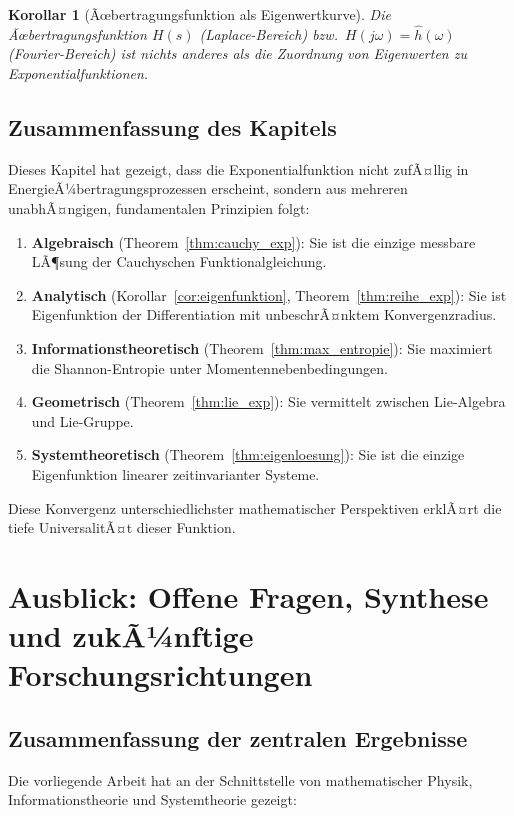 ﻿\documentclass[12pt,a4paper]{article}
\newtheorem{corollary}[theorem]{Korollar}
\theoremstyle{definition}
\theoremstyle{remark}
\begin{document}
\begin{corollary}[Ãœbertragungsfunktion als Eigenwertkurve]
Die Ãœbertragungsfunktion $H(s)$ (Laplace-Bereich) bzw.\ $H(j\omega) = \hat{h}(\omega)$ (Fourier-Bereich) ist nichts anderes als die Zuordnung von Eigenwerten zu Exponentialfunktionen.
\end{corollary}

\subsection{Zusammenfassung des Kapitels}

Dieses Kapitel hat gezeigt, dass die Exponentialfunktion nicht zufÃ¤llig in EnergieÃ¼bertra\-gungsprozessen erscheint, sondern aus mehreren unabhÃ¤ngigen, fundamentalen Prinzipien folgt:
\begin{enumerate}
\item \textbf{Algebraisch} (Theorem~\ref{thm:cauchy_exp}): Sie ist die einzige messbare LÃ¶sung der Cauchyschen Funktionalgleichung.
\item \textbf{Analytisch} (Korollar~\ref{cor:eigenfunktion}, Theorem~\ref{thm:reihe_exp}): Sie ist Eigenfunktion der Differentiation mit unbeschrÃ¤nktem Konvergenzradius.
\item \textbf{Informationstheoretisch} (Theorem~\ref{thm:max_entropie}): Sie maximiert die Shannon-Entropie unter Momentennebenbedingungen.
\item \textbf{Geometrisch} (Theorem~\ref{thm:lie_exp}): Sie vermittelt zwischen Lie-Algebra und Lie-Gruppe.
\item \textbf{Systemtheoretisch} (Theorem~\ref{thm:eigenloesung}): Sie ist die einzige Eigenfunktion linearer zeitinvarianter Systeme.
\end{enumerate}
Diese Konvergenz unterschiedlichster mathematischer Perspektiven erklÃ¤rt die tiefe UniversalitÃ¤t dieser Funktion.

\section{Ausblick: Offene Fragen, Synthese und zukÃ¼nftige Forschungsrichtungen}
\label{sec:ausblick}

\subsection{Zusammenfassung der zentralen Ergebnisse}

Die vorliegende Arbeit hat an der Schnittstelle von mathematischer Physik, Informationstheorie und Systemtheorie gezeigt:
\end{document}
